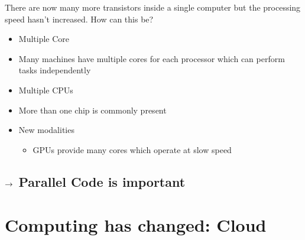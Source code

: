 \documentclass[letterpaper,10pt,english]{sphinxmanual}
\begin{document}
\sphinxAtStartPar
There are now many more transistors inside a single computer but the processing speed hasn’t increased. How can this be?
\begin{itemize}
\item {} 
\sphinxAtStartPar
Multiple Core

\item {} 
\sphinxAtStartPar
Many machines have multiple cores for each processor which can perform tasks independently

\item {} 
\sphinxAtStartPar
Multiple CPUs

\item {} 
\sphinxAtStartPar
More than one chip is commonly present

\item {} 
\sphinxAtStartPar
New modalities
\begin{itemize}
\item {} 
\sphinxAtStartPar
GPUs provide many cores which operate at slow speed

\end{itemize}

\end{itemize}


\subsection{\protect\(\rightarrow\protect\) Parallel Code is important}
\label{\detokenize{01-Introduction:rightarrow-parallel-code-is-important}}

\section{Computing has changed: Cloud}
\label{\detokenize{01-Introduction:computing-has-changed-cloud}}
\end{document}
